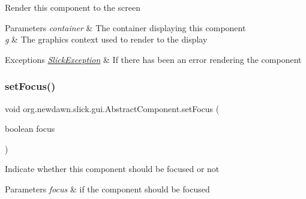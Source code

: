 Render this component to the screen


\begin{DoxyParams}{Parameters}
{\em container} & The container displaying this component \\
\hline
{\em g} & The graphics context used to render to the display \\
\hline
\end{DoxyParams}

\begin{DoxyExceptions}{Exceptions}
{\em \mbox{\hyperlink{classorg_1_1newdawn_1_1slick_1_1_slick_exception}{Slick\+Exception}}} & If there has been an error rendering the component \\
\hline
\end{DoxyExceptions}
\mbox{\label{classorg_1_1newdawn_1_1slick_1_1gui_1_1_abstract_component_a92a19e06c7872abfb02d7e6625f449eb}} 
\subsubsection{\texorpdfstring{set\+Focus()}{setFocus()}}
{\footnotesize\ttfamily void org.\+newdawn.\+slick.\+gui.\+Abstract\+Component.\+set\+Focus (\begin{DoxyParamCaption}\item[{boolean}]{focus }\end{DoxyParamCaption})\hspace{0.3cm}{\ttfamily [inline]}}

Indicate whether this component should be focused or not


\begin{DoxyParams}{Parameters}
{\em focus} & if the component should be focused \\
\hline
\end{DoxyParams}

